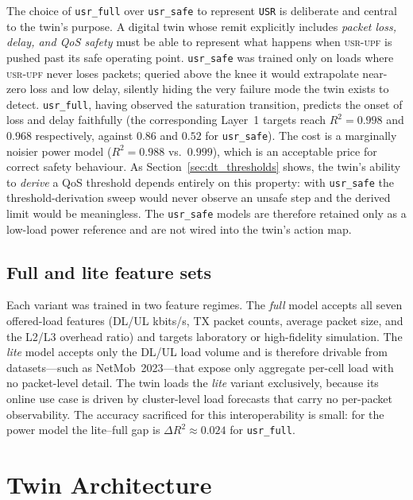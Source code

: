 \documentclass[12pt, a4paper]{report}
\newcommand{\usr}{\textsc{usr-upf}}
\newcommand{\code}[1]{\texttt{#1}}
\begin{document}
\noindent
The choice of \code{usr\_full} over \code{usr\_safe} to represent \code{USR}
is deliberate and central to the twin's purpose. A digital twin whose
remit explicitly includes \emph{packet loss, delay, and QoS safety} must be
able to represent what happens when \usr{} is pushed past its safe operating
point. \code{usr\_safe} was trained only on loads where \usr{} never loses
packets; queried above the knee it would extrapolate near-zero loss and low
delay, silently hiding the very failure mode the twin exists to detect.
\code{usr\_full}, having observed the saturation transition, predicts the
onset of loss and delay faithfully (the corresponding Layer~1 targets reach
$R^2 = 0.998$ and $0.968$ respectively, against $0.86$ and $0.52$ for
\code{usr\_safe}). The cost is a marginally noisier power model
($R^2 = 0.988$ vs.\ $0.999$), which is an acceptable price for correct
safety behaviour. As Section~\ref{sec:dt_thresholds} shows, the twin's
ability to \emph{derive} a QoS threshold depends entirely on this property:
with \code{usr\_safe} the threshold-derivation sweep would never observe an
unsafe step and the derived limit would be meaningless. The \code{usr\_safe}
models are therefore retained only as a low-load power reference and are not
wired into the twin's action map.

\subsection{Full and lite feature sets}

Each variant was trained in two feature regimes. The \emph{full} model accepts
all seven offered-load features (DL/UL kbits/s, TX packet counts, average
packet size, and the L2/L3 overhead ratio) and targets laboratory or
high-fidelity simulation. The \emph{lite} model accepts only the DL/UL load
volume and is therefore drivable from datasets---such as NetMob~2023---that
expose only aggregate per-cell load with no packet-level detail. The twin
loads the \emph{lite} variant exclusively, because its online use case is
driven by cluster-level load forecasts that carry no per-packet observability.
The accuracy sacrificed for this interoperability is small: for the power
model the lite--full gap is $\Delta R^2 \approx 0.024$ for \code{usr\_full}.

\section{Twin Architecture}
\label{sec:dt_arch}
\end{document}
